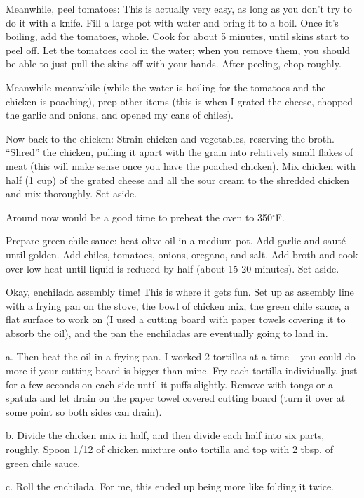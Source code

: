 \documentclass[letterpaper]{recipePMG}
\renewcommand{\deg}{$^\circ$}
\begin{document}
Meanwhile, peel tomatoes: This is actually very easy, as long as you don't try to do it with a knife. Fill a large pot with water and bring it to a boil. Once it's boiling, add the tomatoes, whole. Cook for about 5 minutes, until skins start to peel off. Let the tomatoes cool in the water; when you remove them, you should be able to just pull the skins off with your hands. After peeling, chop roughly.

Meanwhile meanwhile (while the water is boiling for the tomatoes and the chicken is poaching), prep other items (this is when I grated the cheese, chopped the garlic and onions, and opened my cans of chiles).

Now back to the chicken: Strain chicken and vegetables, reserving the broth. ``Shred'' the chicken, pulling it apart with the grain into relatively small flakes of meat (this will make sense once you have the poached chicken). Mix chicken with half (1 cup) of the grated cheese and all the sour cream to the shredded chicken and mix thoroughly. Set aside.
  
Around now would be a good time to preheat the oven to 350\deg F.
  

Prepare green chile sauce: heat olive oil in a medium pot. Add garlic and sauté until golden. Add chiles, tomatoes, onions, oregano, and salt. Add broth and cook over low heat until liquid is reduced by half (about 15-20 minutes). Set aside.

Okay, enchilada assembly time! This is where it gets fun. Set up as assembly line with a frying pan on the stove, the bowl of chicken mix, the green chile sauce, a flat surface to work on (I used a cutting board with paper towels covering it to absorb the oil), and the pan the enchiladas are eventually going to land in.

a.    Then heat the oil in a frying pan. I worked 2 tortillas at a time -- you could do more if your cutting board is bigger than mine. Fry each tortilla individually, just for a few seconds on each side until it puffs slightly. Remove with tongs or a spatula and let drain on the paper towel covered cutting board (turn it over at some point so both sides can drain).

b.    Divide the chicken mix in half, and then divide each half into six parts, roughly. Spoon 1/12 of chicken mixture onto tortilla and top with 2 tbsp. of green chile sauce.

c.    Roll the enchilada. For me, this ended up being more like folding it twice.
\end{document}
